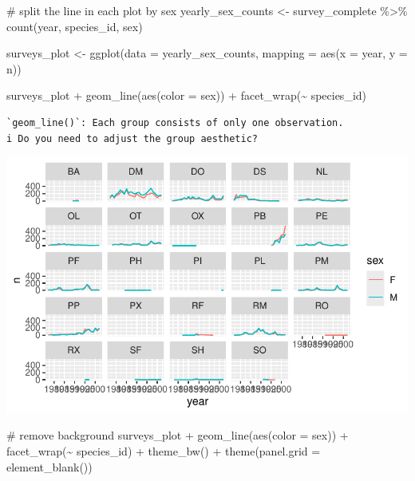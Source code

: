 \documentclass[
  letterpaper,
  DIV=11,
  numbers=noendperiod]{scrreprt}
\newenvironment{Shaded}{\begin{snugshade}}{\end{snugshade}}
\newcommand{\AttributeTok}[1]{\textcolor[rgb]{0.40,0.45,0.13}{#1}}
\newcommand{\CommentTok}[1]{\textcolor[rgb]{0.37,0.37,0.37}{#1}}
\newcommand{\FunctionTok}[1]{\textcolor[rgb]{0.28,0.35,0.67}{#1}}
\newcommand{\NormalTok}[1]{\textcolor[rgb]{0.00,0.23,0.31}{#1}}
\newcommand{\OtherTok}[1]{\textcolor[rgb]{0.00,0.23,0.31}{#1}}
\newcommand{\SpecialCharTok}[1]{\textcolor[rgb]{0.37,0.37,0.37}{#1}}
\begin{document}
\begin{Shaded}
\begin{Highlighting}[]
\CommentTok{\# split the line in each plot by sex}
\NormalTok{yearly\_sex\_counts }\OtherTok{\textless{}{-}}\NormalTok{ survey\_complete }\SpecialCharTok{\%\textgreater{}\%}
    \FunctionTok{count}\NormalTok{(year, species\_id, sex)}

\NormalTok{surveys\_plot }\OtherTok{\textless{}{-}} \FunctionTok{ggplot}\NormalTok{(}\AttributeTok{data =}\NormalTok{ yearly\_sex\_counts, }
    \AttributeTok{mapping =} \FunctionTok{aes}\NormalTok{(}\AttributeTok{x =}\NormalTok{ year, }\AttributeTok{y =}\NormalTok{ n))}

\NormalTok{surveys\_plot }\SpecialCharTok{+} \FunctionTok{geom\_line}\NormalTok{(}\FunctionTok{aes}\NormalTok{(}\AttributeTok{color =}\NormalTok{ sex)) }\SpecialCharTok{+}
    \FunctionTok{facet\_wrap}\NormalTok{(}\SpecialCharTok{\textasciitilde{}}\NormalTok{ species\_id)}
\end{Highlighting}
\end{Shaded}

\begin{verbatim}
`geom_line()`: Each group consists of only one observation.
i Do you need to adjust the group aesthetic?
\end{verbatim}

\includegraphics{src/notebooks/r_files/figure-pdf/unnamed-chunk-45-5.pdf}

\begin{Shaded}
\begin{Highlighting}[]
\CommentTok{\# remove background}
\NormalTok{surveys\_plot }\SpecialCharTok{+} \FunctionTok{geom\_line}\NormalTok{(}\FunctionTok{aes}\NormalTok{(}\AttributeTok{color =}\NormalTok{ sex)) }\SpecialCharTok{+}
    \FunctionTok{facet\_wrap}\NormalTok{(}\SpecialCharTok{\textasciitilde{}}\NormalTok{ species\_id) }\SpecialCharTok{+}
    \FunctionTok{theme\_bw}\NormalTok{() }\SpecialCharTok{+}
    \FunctionTok{theme}\NormalTok{(}\AttributeTok{panel.grid =} \FunctionTok{element\_blank}\NormalTok{())}
\end{Highlighting}
\end{Shaded}
\end{document}
